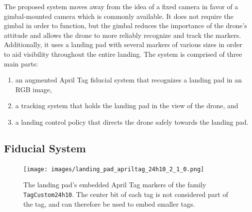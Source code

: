 The proposed system moves away from the idea of a fixed camera in favor of a gimbal-mounted camera which is commonly available.
It does not require the gimbal in order to function, but the gimbal reduces the importance of the drone's attitude
and allows the drone to more reliably recognize and track the markers.
Additionally, it uses a landing pad with several markers of various sizes in order to aid visibility throughout the entire landing.
The system is comprised of three main parts:
\begin{enumerate}
    \item an augmented April Tag fiducial system that recognizes a landing pad in an RGB image,
    \item a tracking system that holds the landing pad in the view of the drone, and
    \item a landing control policy that directs the drone safely towards the landing pad.
\end{enumerate}

\subsection{Fiducial System}

\begin{figure}
    \begin{mdframed}[backgroundcolor=gray!50,linecolor=gray!50]
        \centering
        \texttt{[image: images/landing\_pad\_apriltag\_24h10\_2\_1\_0.png]}
        \end{mdframed}
        \caption{The landing pad's embedded April Tag markers of the family \texttt{TagCustom24h10}.
        \label{figure:landing_pad_apriltag}
        The center bit of each tag is not considered part of the tag, and can therefore be used to embed smaller tags.}
\end{figure}


